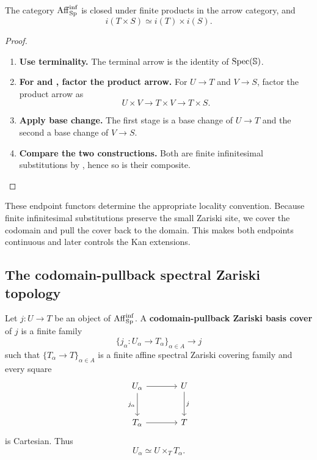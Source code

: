 \begin{proposition}
\label{prop:infinitesimal-category-finite-products}
The category \(\operatorname{Aff}_{\operatorname{Sp}}^{\inf}\) is closed under finite products in the
arrow category, and
\[
    i(T\times S)
    \simeq
    i(T)\times i(S).
\]
\end{proposition}

\begin{proof}
\leavevmode
\begin{enumerate}[label=\textup{(\arabic*)}]
    \item \textbf{Use terminality.}
    The terminal arrow is the identity of \(\operatorname{Spec}(\mathbb S)\).

    \item \textbf{For and , factor the product arrow.}
    For \(U\to T\) and \(V\to S\), factor the product arrow as
    \[
        U\times V
        \longrightarrow
        T\times V
        \longrightarrow
        T\times S.
    \]

    \item \textbf{Apply base change.}
    The first stage is a base change of \(U\to T\) and the second a base change of \(V\to S\).

    \item \textbf{Compare the two constructions.}
    Both are finite infinitesimal substitutions by ,
    hence so is their composite.
\end{enumerate}
\end{proof}
These endpoint functors determine the appropriate locality convention.
Because finite infinitesimal substitutions preserve the small Zariski site, we
cover the codomain and pull the cover back to the domain. This makes both
endpoints continuous and later controls the Kan extensions.

\subsection{The codomain-pullback spectral Zariski topology}

\begin{definition}
\label{def:target-pullback-zariski-cover}
Let \(j:U\to T\) be an object of \(\operatorname{Aff}_{\operatorname{Sp}}^{\inf}\). A
\textbf{codomain-pullback Zariski basis cover} of \(j\) is a finite family
\[
    \{j_\alpha:U_\alpha\to T_\alpha\}_{\alpha\in A}
    \longrightarrow
    j
\]
such that \(\{T_\alpha\to T\}_{\alpha\in A}\) is a finite affine spectral
Zariski covering family and every square
\[
\begin{tikzcd}[column sep=large, row sep=large]
    U_\alpha \arrow[r] \arrow[d,"j_\alpha"']
        & U \arrow[d,"j"]
    \\
    T_\alpha \arrow[r]
        & T
\end{tikzcd}
\]
is Cartesian. Thus
\[
    U_\alpha\simeq U\times_TT_\alpha.
\]
\end{definition}

